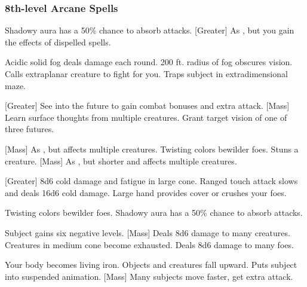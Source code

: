 \subsubsection{8th-level Arcane Spells} 
\begin{swspelllist}
     Shadowy aura has a 50\% chance to absorb attacks. 
    [Greater] As , but you gain the effects of dispelled spells.

     Acidic solid fog deals damage each round.
     200 ft. radius of fog obscures vision.
     Calls extraplanar creature to fight for you.
     Traps subject in extradimensional maze.

    [Greater] See into the future to gain combat bonuses and extra attack.
    [Mass] Learn surface thoughts from multiple creatures.
     Grant target vision of one of three futures.

    [Mass] As , but affects multiple creatures.
     Twisting colors bewilder foes.
     Stuns a creature.
    [Mass] As , but shorter and affects multiple creatures.

    [Greater] 8d6 cold damage and fatigue in large cone.
     Ranged touch attack slows and deals 16d6 cold damage.
    \spellhead{}
     Large hand provides cover or crushes your foes.

     Twisting colors bewilder foes.
     Shadowy aura has a 50\% chance to absorb attacks. 
    \spellhead*{}

     Subject gains six negative levels.
    [Mass] Deals 8d6 damage to many creatures.
     Creatures in medium cone become exhausted.
     Deals 8d6 damage to many foes.

     Your body becomes living iron.
     Objects and creatures fall upward.
    \M Puts subject into suspended animation.
    [Mass] Many subjects move faster, get extra attack.
\end{swspelllist}

